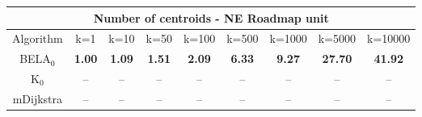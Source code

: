 \begin{tabular}{c|cccccccc}\toprule
\multicolumn{9}{c}{Number of centroids - NE Roadmap unit}\\ \midrule
Algorithm & k=1 & k=10 & k=50 & k=100 & k=500 & k=1000 & k=5000 & k=10000 \\ \midrule
BELA$_0$ & \textbf{1.00} & \textbf{1.09} & \textbf{1.51} & \textbf{2.09} & \textbf{6.33} & \textbf{9.27} & \textbf{27.70} & \textbf{41.92} \\
K$_0$ & -- & -- & -- & -- & -- & -- & -- & -- \\
mDijkstra & -- & -- & -- & -- & -- & -- & -- & -- \\ \bottomrule 
\end{tabular}
